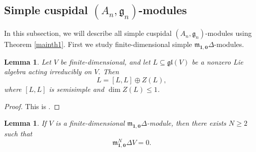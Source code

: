\documentclass[12pt,a4paper]{amsart}
\def\mg{g}%
\def\gl{gl}%
\newtheorem{lemma}[theorem]{Lemma}%
\numberwithin{equation}{section}
\def\mg{\mathfrak{g}}
\def\mm{\mathfrak{m}}
\def\gl{\mathfrak{gl}}
\def\b1{\mathbf{1}}
\def\bo{\mathbf{0}}
\begin{document}
\subsection{Simple cuspidal $(A_n,\mg_n)$-modules}
In this subsection, we will describe all simple cuspidal $(A_n,\mg_n)$-modules
using Theorem \ref{mainth1}. First we study finite-dimensional simple $\mm_{\b1,\bo}\Delta$-modules.

\begin{lemma}\label{Hu}
Let \(V\) be finite-dimensional, and let
\(L\subseteq\gl(V)\) be a nonzero Lie algebra acting irreducibly on
\(V\). Then
\[
L=[L,L]\oplus Z(L),
\]
where \([L,L]\) is semisimple and \(\dim Z(L)\leq1\).
\end{lemma}

\begin{proof}
This is \cite[Proposition~19.1]{Hu}.
\end{proof}

\begin{lemma}\label{lem:finite-jet}
If \(V\) is a finite-dimensional \(\mathfrak m_{\b1,\bo}\Delta\)-module, then
there exists \(N\geq 2\) such that
\[
\mm_{\b1,\bo}^N\Delta V=0.
\]
\end{lemma}
\end{document}
